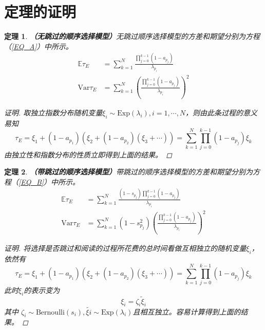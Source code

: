 \documentclass[UTF8]{ctexart}
\theoremstyle{plain}
\newtheorem{thm}{定理}[section]
\theoremstyle{definition}
\theoremstyle{remark}
\begin{document}
	\section{定理的证明}
	\begin{thm}\textbf{（无跳过的顺序选择模型）}无跳过顺序选择模型的方差和期望分别为方程（\ref{EQ_A}）中所示。
		\begin{equation*}
		\begin{aligned}
		\mathbb{E} \tau_E & = \sum_{k=1}^N \frac{\prod\limits_{j=0}^{k-1}(1-a_{p_j})}{\lambda_{p_i}} \\
		\mathrm{Var} \tau_E & = \sum_{k=1}^N \left(\frac{\prod\limits_{j=0}^{k-1}(1-a_{p_j})}{\lambda_{p_i}}\right)^2
		\end{aligned}
		\end{equation*}
	\begin{proof}[证明]
		取独立指数分布随机变量$\xi_i \sim \mathrm{Exp}(\lambda_i), i = 1, \cdots, N$，则由此条过程的意义易知
		$$
		\tau_E = \xi_1 + (1-a_{p_1})(\xi_2 + (1-a_{p_2})(\xi_3+\cdots)) = \sum_{k=1}^N \prod_{j=0}^{k-1} (1-a_{p_j}) \xi_k
		$$
		由独立性和指数分布的性质立即得到上面的结果。
	\end{proof}
	\end{thm}
	\begin{thm}\textbf{（带跳过的顺序选择模型）}带跳过的顺序选择模型的方差和期望分别为方程（\ref{EQ_B}）中所示。
		\begin{equation*} 
		\begin{aligned}
		\mathbb{E} \tau_E & = \sum_{k=1}^N \frac{(1-s_{p_j})\prod\limits_{j=0}^{k-1}(1-a_{p_j})}{\lambda_{p_i}} \\
		\mathrm{Var} \tau_E & = \sum_{k=1}^N (1-s_{p_j}^2)\left(\frac{\prod\limits_{j=0}^{k-1}(1-a_{p_j})}{\lambda_{p_i}}\right)^2
		\end{aligned}
		\end{equation*}
		\begin{proof}[证明]
			将选择是否跳过和阅读的过程所花费的总时间看做互相独立的随机变量$\xi_i$，依然有
			$$
			\tau_E = \xi_1 + (1-a_{p_1})(\xi_2 + (1-a_{p_2})(\xi_3+\cdots)) = \sum_{k=1}^N \prod_{j=0}^{k-1} (1-a_{p_j}) \xi_k
			$$
			此时$\xi_i$的表示变为
			$$
			\xi_i = \zeta_i \tilde{\xi}_i
			$$
			其中
			$\zeta_i \sim \mathrm{Bernoulli}(s_i), \tilde{\xi{i}} \sim \mathrm{Exp}(\lambda_i)$且相互独立。容易计算得到上面的结果。
		\end{proof}
	\end{thm}
\end{document}
